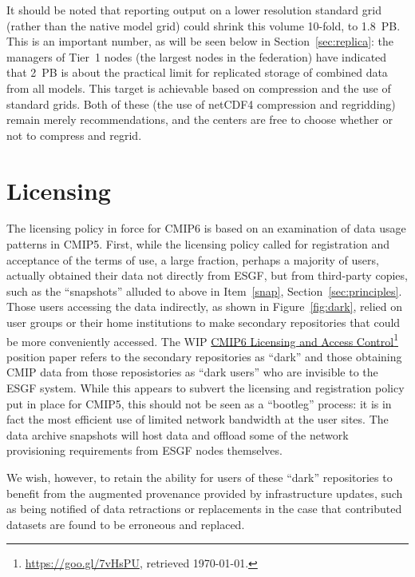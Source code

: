 \documentclass[gmd,manuscript]{copernicus}
\newcommand{\pllabel}[1]{\label{p-#1}\linelabel{l-#1}}
\newcommand{\urlref}[2] {\href{#1}{#2}\footnote{\url{#1}, retrieved \today.}}
\begin{document}
It should be noted that reporting output on a lower resolution
standard grid (rather than the native model grid) could shrink this
volume 10-fold, to 1.8~PB. This is an important number, as will be
seen below in Section~\ref{sec:replica}: the managers of Tier~1 nodes
\pllabel{RC3-18}
(the largest nodes in the federation) have indicated that 2~PB is
about the practical limit for replicated storage of combined data from
all models.
This target is achievable based on compression and the use of standard
grids. Both of these (the use of netCDF4 compression and regridding)
remain merely recommendations, and the centers are free to choose
whether or not to compress and regrid.

\section{Licensing}
\label{sec:licensing}

The licensing policy in force for CMIP6 is based on an examination of
data usage patterns in CMIP5. First, while the licensing policy called
for registration and acceptance of the terms of use, a large fraction,
perhaps a majority of users, actually obtained their data not directly
from ESGF, but from
\pllabel{RC1-33}
third-party copies, such as the ``snapshots'' alluded to above in
Item~\ref{snap}, Section~\ref{sec:principles}. Those users accessing
the data indirectly, as shown in Figure~\ref{fig:dark}, relied on user
groups or their home institutions to make secondary repositories that
could be more conveniently accessed. The WIP
\urlref{https://goo.gl/7vHsPU}{CMIP6 Licensing and Access Control}
position paper refers to the secondary repositories as ``dark'' and
those obtaining CMIP data from those reposistories as ``dark users''
who are invisible to the ESGF system. While this appears to subvert
the licensing and registration policy put in place for CMIP5, this
should not be seen as a ``bootleg'' process: it is in fact the most
efficient use of limited network bandwidth at the user sites.
\pllabel{RC2-29}
The data archive snapshots will host data and offload some of the
network provisioning requirements from ESGF nodes themselves.

We wish, however, to retain the ability for users of these ``dark''
repositories to benefit from the augmented provenance provided by
infrastructure updates, such as being notified of data retractions or
replacements in the case that contributed datasets are found to be
erroneous and replaced.
\end{document}
